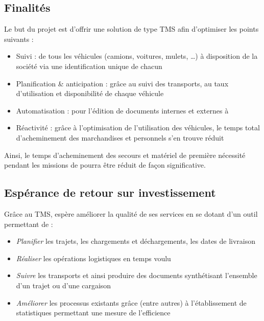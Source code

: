 \subsection{Finalités}
Le but du projet est d'offrir une solution de type TMS afin d'optimiser les points suivants :
\begin{itemize}
\item Suivi : de tous les véhicules (camions, voitures, mulets, …) à disposition de la société via une identification unique de chacun
\item Planification \& anticipation : grâce au suivi des transports, au taux d'utilisation et disponibilité de chaque véhicule
\item Automatisation : pour l'édition de documents internes et externes à \mo
\item Réactivité : grâce à l'optimisation de l'utilisation des véhicules, le temps total d'acheminement des marchandises et personnels s'en trouve réduit
\end{itemize}
Ainsi, le temps d'acheminement des secours et matériel de première nécessité pendant les missions de \mo pourra être réduit de façon significative.
\subsection{Espérance de retour sur investissement}
Grâce au TMS, \mo espère améliorer la qualité de ses services en se dotant d'un outil permettant de :
\begin{itemize}
	\item \emph{Planifier} les trajets, les chargements et déchargements, les dates de livraison
	\item \emph{Réaliser} les opérations logistiques en temps voulu
	\item \emph{Suivre} les transports et ainsi produire des documents synthétisant l'ensemble d'un trajet ou d'une cargaison
	\item \emph{Améliorer} les processus existants grâce (entre autres) à l'établissement de statistiques permettant une mesure de l'efficience
\end{itemize}

